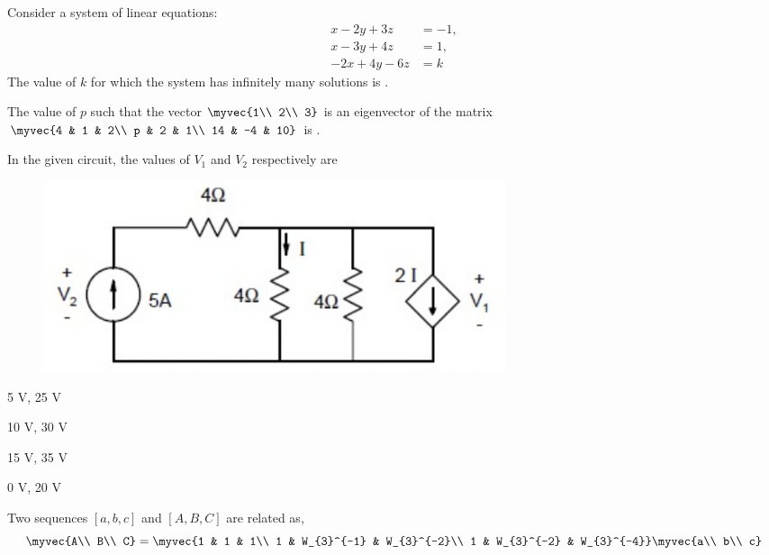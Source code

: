     \item Consider a system of linear equations:
    \begin{align*}
        x-2y+3z &= -1, \\
        x-3y+4z &= 1,  \\
        -2x+4y-6z &= k
    \end{align*}
    The value of $k$ for which the system has infinitely many solutions is \underline{\hspace{2cm}}.

    \hfill{}
    \item The value of $p$ such that the vector $\myvec{1\\ 2\\ 3}$ is an eigenvector of the matrix $\myvec{4 & 1 & 2\\ p & 2 & 1\\ 14 & -4 & 10}$ is \underline{\hspace{2cm}}.
    \hfill{}
    \item In the given circuit, the values of $V_{1}$ and $V_{2}$ respectively are
    \hfill{}
    \begin{figure}[H]
        \centering
        \includegraphics[width=0.5\columnwidth]{GATE/2015/EC/figs/q18.png}
        \caption*{}
        \label{fig:q18}
    \end{figure}
    \begin{enumerate}
        \begin{multicols}{4}
            \item 5 V, 25 V
            \item 10 V, 30 V
            \item 15 V, 35 V
            \item 0 V, 20 V
        \end{multicols}
    \end{enumerate}
    \item Two sequences $[a,b,c]$ and $[A,B,C]$ are related as,
    $$ \myvec{A\\ B\\ C} = \myvec{1 & 1 & 1\\ 1 & W_{3}^{-1} & W_{3}^{-2}\\ 1 & W_{3}^{-2} & W_{3}^{-4}} \myvec{a\\ b\\ c}$$ 
